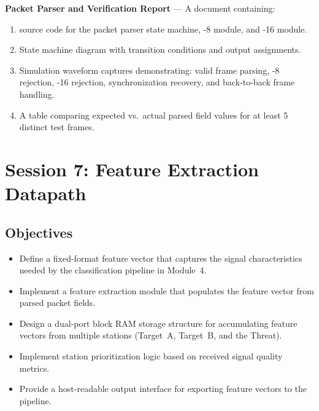 \documentclass[11pt,letterpaper]{article}
\begin{document}
	\begin{tcolorbox}[deliverable={Session 6 Deliverable}]
		\textbf{Packet Parser and \CRC{} Verification Report} --- A document containing:
		\begin{enumerate}
			\item \VHDL{} source code for the packet parser state machine, \CRC{}-8 module, and \CRC{}-16 module.
			\item State machine diagram with transition conditions and output assignments.
			\item Simulation waveform captures demonstrating: valid frame parsing, \CRC{}-8 rejection, \CRC{}-16 rejection, synchronization recovery, and back-to-back frame handling.
			\item A table comparing expected vs.\ actual parsed field values for at least 5 distinct test frames.
		\end{enumerate}
	\end{tcolorbox}

	\newpage
	\section{Session 7: Feature Extraction Datapath}
	\label{sec:feature}

	\subsection{Objectives}

	\begin{itemize}[leftmargin=2em]
		\item Define a fixed-format feature vector that captures the signal characteristics needed by the \ML{} classification pipeline in Module~4.
		\item Implement a feature extraction module that populates the feature vector from parsed packet fields.
		\item Design a dual-port block RAM storage structure for accumulating feature vectors from multiple stations (Target~A, Target~B, and the Threat).
		\item Implement station prioritization logic based on received signal quality metrics.
		\item Provide a host-readable output interface for exporting feature vectors to the \ML{} pipeline.
	\end{itemize}
\end{document}
